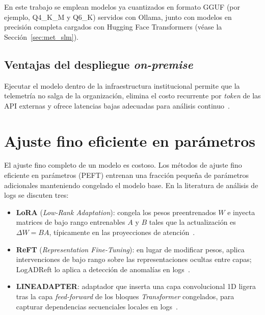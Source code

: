 En este trabajo se emplean modelos ya cuantizados en formato GGUF (por ejemplo, Q4\_K\_M y Q6\_K) servidos con Ollama, junto con modelos en precisión completa cargados con Hugging Face Transformers (véase la Sección~\ref{sec:met_slm}).

\subsection{Ventajas del despliegue \textit{on-premise}}

Ejecutar el modelo dentro de la infraestructura institucional permite que la telemetría no salga de la organización, elimina el costo recurrente por \textit{token} de las API externas y ofrece latencias bajas adecuadas para análisis continuo~\cite{wang2025_slm_survey, pardeshi2026_smartllm, ma2026_adaptivelog}. %

\section{Ajuste fino eficiente en parámetros}\label{sec:mt_peft}

El ajuste fino completo de un modelo es costoso. Los métodos de ajuste fino eficiente en parámetros (PEFT) entrenan una fracción pequeña de parámetros adicionales manteniendo congelado el modelo base. En la literatura de análisis de logs se discuten tres:

\begin{itemize}
  \item \textbf{LoRA} (\textit{Low-Rank Adaptation}): congela los pesos preentrenados $W$ e inyecta matrices de bajo rango entrenables $A$ y $B$ tales que la actualización es $\Delta W = BA$, típicamente en las proyecciones de atención~\cite{lim2025_logadreft, wang2025_slm_survey}. %
  \item \textbf{ReFT} (\textit{Representation Fine-Tuning}): en lugar de modificar pesos, aplica intervenciones de bajo rango sobre las representaciones ocultas entre capas; LogADReft lo aplica a detección de anomalías en logs~\cite{lim2025_logadreft}.
  \item \textbf{LINEADAPTER}: adaptador que inserta una capa convolucional 1D ligera tras la capa \textit{feed-forward} de los bloques \textit{Transformer} congelados, para capturar dependencias secuenciales locales en logs~\cite{liu2025_lineadapter}.
\end{itemize}

